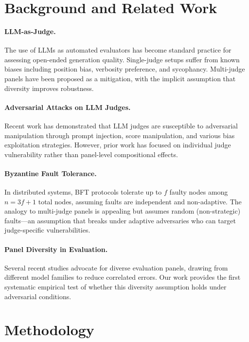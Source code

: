 \documentclass[11pt,a4paper]{article}
\begin{document}
\section{Background and Related Work}

\paragraph{LLM-as-Judge.} The use of LLMs as automated evaluators has become standard practice for assessing open-ended generation quality. Single-judge setups suffer from known biases including position bias, verbosity preference, and sycophancy. Multi-judge panels have been proposed as a mitigation, with the implicit assumption that diversity improves robustness.

\paragraph{Adversarial Attacks on LLM Judges.} Recent work has demonstrated that LLM judges are susceptible to adversarial manipulation through prompt injection, score manipulation, and various bias exploitation strategies. However, prior work has focused on individual judge vulnerability rather than panel-level compositional effects.

\paragraph{Byzantine Fault Tolerance.} In distributed systems, BFT protocols tolerate up to $f$ faulty nodes among $n = 3f+1$ total nodes, assuming faults are independent and non-adaptive. The analogy to multi-judge panels is appealing but assumes random (non-strategic) faults---an assumption that breaks under adaptive adversaries who can target judge-specific vulnerabilities.

\paragraph{Panel Diversity in Evaluation.} Several recent studies advocate for diverse evaluation panels, drawing from different model families to reduce correlated errors. Our work provides the first systematic empirical test of whether this diversity assumption holds under adversarial conditions.

\section{Methodology}
\end{document}
